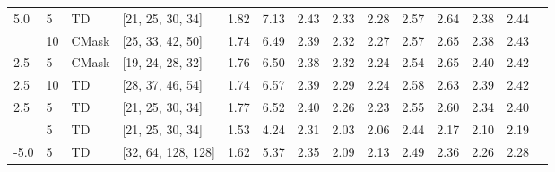 \begin{tabular}{llllrrrrrrrrrr}
5.0 & 5 & TD & [21, 25, 30, 34] & \cellcolor{green!20}1.82 & \cellcolor{green!20}7.13 & \cellcolor{green!20}2.43 & 2.33 & \cellcolor{green!20}2.28 & 2.57 & 2.64 & 2.38 & 2.44 \\
\hdashline
\midrule
2.5 & 10 & CMask & [25, 33, 42, 50] & 1.74 & 6.49 & \cellcolor{green!20}2.39 & \cellcolor{green!20}2.32 & \cellcolor{green!20}2.27 & \cellcolor{green!20}2.57 & \cellcolor{green!20}2.65 & 2.38 & \cellcolor{green!50}2.43 \\
2.5 & 5 & CMask & [19, 24, 28, 32] & \cellcolor{green!20}1.76 & \cellcolor{green!20}6.50 & 2.38 & 2.32 & 2.24 & 2.54 & 2.65 & \cellcolor{green!20}2.40 & 2.42 \\
2.5 & 10 & TD & [28, 37, 46, 54] & 1.74 & \cellcolor{green!20}6.57 & 2.39 & \cellcolor{green!20}2.29 & \cellcolor{green!20}2.24 & \cellcolor{green!20}2.58 & \cellcolor{green!20}2.63 & \cellcolor{green!20}2.39 & \cellcolor{green!50}2.42 \\
2.5 & 5 & TD & [21, 25, 30, 34] & \cellcolor{green!20}1.77 & 6.52 & \cellcolor{green!20}2.40 & 2.26 & 2.23 & 2.55 & 2.60 & 2.34 & 2.40 \\
\hdashline
\midrule
-5.0 & 5 & TD & [21, 25, 30, 34] & 1.53 & 4.24 & 2.31 & 2.03 & 2.06 & 2.44 & 2.17 & 2.10 & 2.19 \\
-5.0 & 5 & TD & [32, 64, 128, 128] & \cellcolor{green!20}1.62 & \cellcolor{green!20}5.37 & \cellcolor{green!20}2.35 & \cellcolor{green!20}2.09 & \cellcolor{green!20}2.13 & \cellcolor{green!20}2.49 & \cellcolor{green!20}2.36 & \cellcolor{green!20}2.26 & \cellcolor{green!50}2.28 \\
\bottomrule
\end{tabular}